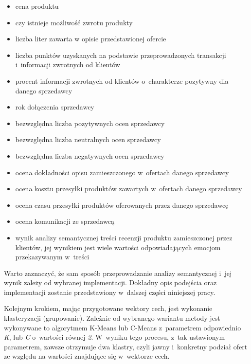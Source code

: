 \documentclass[../Kamil_Kowalewski_Main.tex]{subfiles}
\begin{document}
{{    %
        \begin{itemize}[noitemsep,topsep=1pt]
            \item cena produktu
            \item czy istnieje możliwość zwrotu produkty
            \item liczba liter zawarta w opisie przedstawionej ofercie
            \item liczba punktów uzyskanych na podstawie przeprowadzonych transakcji
            i~informacji zwrotnych od klientów
            \item procent informacji zwrotnych od klientów o~charakterze pozytywny dla
            danego sprzedawcy
            \item rok dołączenia sprzedawcy
            \item bezwzględna liczba pozytywnych ocen sprzedawcy
            \item bezwzględna liczba neutralnych ocen sprzedawcy
            \item bezwzględna liczba negatywnych ocen sprzedawcy
            \item ocena dokładności opisu zamieszczonego w~ofertach danego sprzedawcy
            \item ocena kosztu przesyłki produktów zawartych w~ofertach danego sprzedawcy
            \item ocena czasu przesyłki produktów oferowanych przez danego sprzedawcę
            \item ocena komunikacji ze sprzedawcą
            \item wynik analizy semantycznej treści recenzji produktu zamieszczonej
            przez klientów, jej wynikiem jest wiele wartości odpowiadających emocjom
            przekazywanym w~treści
        \end{itemize}
        \bigskip

        Warto zaznaczyć, że sam sposób przeprowadzanie analizy semantycznej i~jej wynik
        zależy od wybranej implementacji. Dokładny opis podejścia oraz implementacji
        zostanie przedstawiony w~dalszej części niniejszej pracy.

        Kolejnym krokiem, mając przygotowane wektory cech, jest wykonanie klasteryzacji
        (grupowanie). Zależnie od wybranego wariantu metody jest wykonywane to
        algorytmem K-Means lub C-Means z~parametrem odpowiednio \textit{K}, lub
        \textit{C} o~wartości równej \textit{2}. W~wyniku tego procesu, z~tak ustawionym
        parametrem, zawsze otrzymuje dwa klastry, czyli jawny i~konkretny podział ofert
        ze względu na wartości znajdujące się w~wektorze cech.

}}
\end{document}
